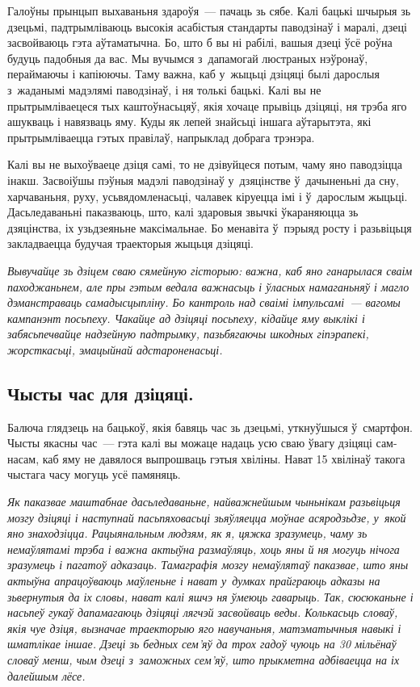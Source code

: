 Галоўны прынцып выхаваньня здароўя~--- пачаць зь сябе. Калі бацькі шчырыя зь дзецьмі, падтрымліваюць высокія асабістыя стандарты паводзінаў і маралі, дзеці засвойваюць гэта аўтаматычна. Бо, што б вы ні рабілі, вашыя дзеці ўсё роўна будуць падобныя да вас. Мы вучымся з~дапамогай люстраных нэўронаў, пераймаючы і капіюючы. Таму важна, каб у~жыцьці дзіцяці былі дарослыя з~жаданымі мадэлямі паводзінаў, і ня толькі бацькі. Калі вы не прытрымліваецеся тых каштоўнасьцяў, якія хочаце прывіць дзіцяці, ня трэба яго ашукваць і навязваць яму. Куды як лепей знайсьці іншага аўтарытэта, які прытрымліваецца гэтых правілаў, напрыклад добрага трэнэра.

Калі вы не выхоўваеце дзіця самі, то не дзівуйцеся потым, чаму яно паводзіцца інакш. Засвоіўшы пэўныя мадэлі паводзінаў у~дзяцінстве ў~дачыненьні да сну, харчаваньня, руху, усьвядомленасьці, чалавек кіруецца імі і ў~дарослым жыцьці. Дасьледаваньні паказваюць, што, калі здаровыя звычкі ўкараняюцца зь дзяцінства, іх узьдзеяньне максімальнае. Бо менавіта ў~пэрыяд росту і разьвіцьця закладваецца будучая траекторыя жыцьця дзіцяці.

\emph{Вывучайце зь дзіцем сваю сямейную гісторыю: важна, каб яно ганарылася сваім паходжаньнем, але пры гэтым ведала важнасьць і ўласных намаганьняў і магло дэманстраваць самадысцыпліну. Бо кантроль над сваімі імпульсамі~--- вагомы кампанэнт посьпеху. Чакайце ад дзіцяці посьпеху, кідайце яму выклікі і забясьпечвайце надзейную падтрымку, пазьбягаючы шкодных гіпэрапекі, жорсткасьці, эмацыйнай адстароненасьці.}

\subsection*{Чысты час для дзіцяці.}

Балюча глядзець на бацькоў, якія бавяць час зь дзецьмі, уткнуўшыся ў~смартфон. Чысты якасны час~--- гэта калі вы можаце надаць усю сваю ўвагу дзіцяці сам-насам, каб яму не давялося выпрошваць гэтыя хвіліны. Нават 15 хвілінаў такога чыстага часу могуць усё памяняць.

\emph{Як паказвае маштабнае дасьледаваньне, найважнейшым чыньнікам разьвіцьця мозгу дзіцяці і наступнай пасьпяховасьці зьяўляецца моўнае асяродзьдзе, у~якой яно знаходзіцца. Рацыянальным людзям, як я, цяжка зразумець, чаму зь немаўлятамі трэба і важна актыўна размаўляць, хоць яны й ня могуць нічога зразумець і пагатоў адказаць. Тамаграфія мозгу немаўлятаў паказвае, што яны актыўна апрацоўваюць маўленьне і нават у~думках прайграюць адказы на зьвернутыя да іх словы, нават калі яшчэ ня ўмеюць гаварыць. Так, сюсюканьне і насьпеў гукаў дапамагаюць дзіцяці лягчэй засвойваць веды. Колькасьць словаў, якія чуе дзіця, вызначае траекторыю яго навучаньня, матэматычныя навыкі і шматлікае іншае. Дзеці зь бедных сем'яў да трох гадоў чуюць на 30 мільёнаў словаў менш, чым дзеці з~заможных сем'яў, што прыкметна адбіваецца на іх далейшым лёсе.}

